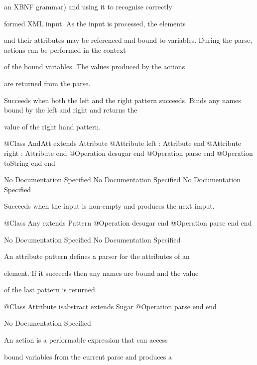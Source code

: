       an XBNF grammar) and using it to recognise correctly

      formed XML input. As the input is processed, the elements

      and their attributes may be referenced and bound to variables.
      During the parse, actions can be performed in the context

      of the bound variables. The values produced by the actions

      are returned from the parse.

      Succeeds when both the left and the right pattern succeeds.
      Binds any names bound by the left and right and returns the

      value of the right hand pattern.
\begin{Interface}
@Class AndAtt extends Attribute
  @Attribute left : Attribute end
  @Attribute right : Attribute end
  @Operation desugar end
  @Operation parse end
  @Operation toString end
end
\end{Interface}
No Documentation Specified
No Documentation Specified
No Documentation Specified

      Succeeds when the input is non-empty and produces the next imput.
\begin{Interface}
@Class Any extends Pattern
  @Operation desugar end
  @Operation parse end
end
\end{Interface}
No Documentation Specified
No Documentation Specified

      An attribute pattern defines a parser for the attributes of an

      element. If it succeeds then any names are bound and the value

      of the last pattern is returned.
\begin{Interface}
@Class Attribute isabstract extends Sugar
  @Operation parse end
end
\end{Interface}
No Documentation Specified

      An action is a performable expression that can access

      bound variables from the current parse and produces a

